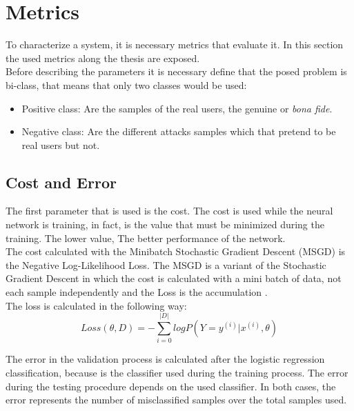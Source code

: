 \section{Metrics}
To characterize a system, it is necessary metrics that evaluate it. In this section the used metrics along the thesis are exposed.\\

Before describing the parameters it is necessary define that the posed problem is bi-class, that means that only two classes would be used:

\begin{itemize}
\item Positive class: Are the samples of the real users, the genuine or \textit{bona fide}.
\item Negative class: Are the different attacks samples which that pretend to be real users but not.
\end{itemize}

\subsection{Cost and Error}
The first parameter that is used is the cost. The cost is used while the neural network is training, in fact, is the value that must be minimized during the training. The lower value, The better performance of the network.\\

The cost calculated with the Minibatch Stochastic Gradient Descent (MSGD) is the Negative Log-Likelihood Loss. The MSGD is a variant of the Stochastic Gradient Descent in which the cost is calculated with a mini batch of data, not each sample independently and the Loss is the accumulation \cite{Stutz}.\\

The loss is calculated in the following way:\\

\begin{equation}
  Loss(\theta, D) = - \sum_{i=0}^{|D|}log P(Y = y^{(i)}|x^{(i)}, \theta)
\end{equation}

The error in the validation process is calculated after the logistic regression classification, because is the classifier used during the training process. The error during the testing procedure depends on the used classifier. In both cases, the error represents the number of misclassified samples over the total samples used.\\ 



